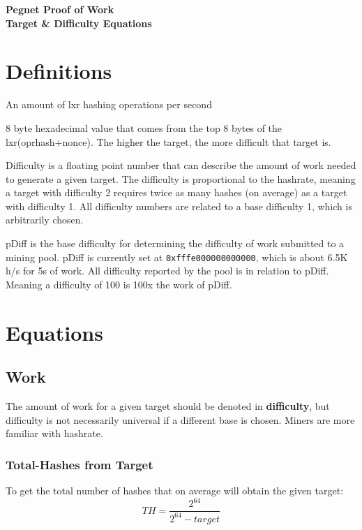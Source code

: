 \documentclass[12pt]{article}
\begin{document}
\begin{center}
{\bf
Pegnet Proof of Work \\
Target \& Difficulty Equations\\
}

\end{center}

\section{Definitions}

\begin{description}[font=\sffamily\bfseries, leftmargin=1cm, style=nextline]
    \item[Hash-rate]
    An amount of lxr hashing operations per second
    \item[Target]
    8 byte hexadecimal value that comes from the top 8 bytes of the lxr(oprhash+nonce). The higher the target, the more difficult that target is.
    \item[Difficulty]
    Difficulty is a floating point number that can describe the amount of work needed to generate a given target. The difficulty is proportional to the hashrate, meaning a target with difficulty 2 requires twice as many hashes (on average) as a target with difficulty 1. All difficulty numbers are related to a base difficulty 1, which is arbitrarily chosen.
    \item[pDiff]
    pDiff is the base difficulty for determining the difficulty of work submitted to a mining pool. pDiff is currently set at \texttt{0xfffe000000000000}, which is about 6.5K h/s for 5s of work. All difficulty reported by the pool is in relation to pDiff. Meaning a difficulty of 100 is 100x the work of pDiff.
\end{description}

\pagebreak
\section{Equations}

\subsection{Work}

The amount of work for a given target should be denoted in \textbf{difficulty}, but difficulty is not necessarily universal if a different base is chosen. Miners are more familiar with hashrate.


   \subsubsection{Total-Hashes from Target}
    To get the total number of hashes that on average will obtain the given target: \\
    \large{\[
    TH = \frac{2^{64}}{2^{64}-target}
    \]}
\end{document}

